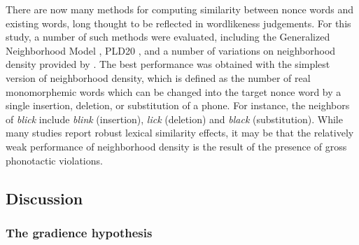 There are now many methods for computing similarity between nonce words and existing words, long thought to be reflected in wordlikeness judgements. 
For this study, a number of such methods were evaluated, including the Generalized Neighborhood Model \citep{Bailey2001}, PLD20 \citep{Suarez2011}, and a number of variations on neighborhood density \citep{Coltheart1977} provided by \citet{Vaden2009}. The best performance was obtained with the simplest version of neighborhood density, which is defined as the number of real monomorphemic words which can be changed into the target nonce word by a single insertion, deletion, or substitution of a phone. For instance, the neighbors of \emph{blick} include \emph{blink} (insertion), \emph{lick} (deletion) and \emph{black} (substitution). While many studies \citep[e.g.,][]{Bailey2001} report robust lexical similarity effects, it may be that the relatively weak performance of neighborhood density is the result of the presence of gross phonotactic violations.

\subsection{Discussion} \label{2discussion}

\subsubsection{The gradience hypothesis}

